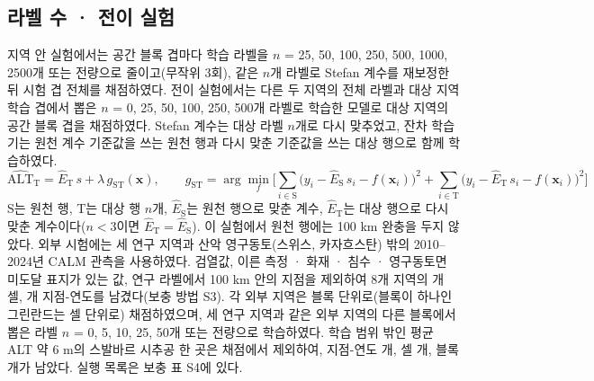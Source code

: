 \subsection{라벨 수 · 전이 실험}
지역 안 실험에서는 공간 블록 겹마다 학습 라벨을 $n$ = 25, 50, 100, 250, 500, 1000, 2500개 또는 전량으로 줄이고(무작위 3회), 같은 $n$개 라벨로 Stefan 계수를 재보정한 뒤 시험 겹 전체를 채점하였다. 전이 실험에서는 다른 두 지역의 전체 라벨과 대상 지역 학습 겹에서 뽑은 $n$ = 0, 25, 50, 100, 250, 500개 라벨로 학습한 모델로 대상 지역의 공간 블록 겹을 채점하였다. Stefan 계수는 대상 라벨 $n$개로 다시 맞추었고, 잔차 학습기는 원천 계수 기준값을 쓰는 원천 행과 다시 맞춘 기준값을 쓰는 대상 행으로 함께 학습하였다.
\begin{equation}
\widehat{\mathrm{ALT}}_{\mathrm{T}} = \hat{E}_{\mathrm{T}}\, s + \lambda\, g_{\mathrm{ST}}(\mathbf{x}), \qquad
g_{\mathrm{ST}} = \arg\min_{f} \Big[ \sum_{i \in \mathrm{S}} \big( y_i - \hat{E}_{\mathrm{S}}\, s_i - f(\mathbf{x}_i) \big)^{2} + \sum_{i \in \mathrm{T}} \big( y_i - \hat{E}_{\mathrm{T}}\, s_i - f(\mathbf{x}_i) \big)^{2} \Big]
\label{eq:transfer}
\end{equation}
S는 원천 행, T는 대상 행 $n$개, $\hat{E}_{\mathrm{S}}$는 원천 행으로 맞춘 계수, $\hat{E}_{\mathrm{T}}$는 대상 행으로 다시 맞춘 계수이다($n < 3$이면 $\hat{E}_{\mathrm{T}} = \hat{E}_{\mathrm{S}}$). 이 실험에서 원천 행에는 100 km 완충을 두지 않았다. 외부 시험에는 세 연구 지역과 산악 영구동토(스위스, 카자흐스탄) 밖의 2010--2024년 CALM 관측\cite{Streletskiy2025}을 사용하였다. 검열값, 이른 측정 · 화재 · 침수 · 영구동토면 미도달 표지가 있는 값, 연구 라벨에서 100 km 안의 지점을 제외하여 8개 지역의 \nextcells{}개 셀, \nextcy{}개 지점-연도를 남겼다(보충 방법 S3). 각 외부 지역은 블록 단위로(블록이 하나인 그린란드는 셀 단위로) 채점하였으며, 세 연구 지역과 같은 외부 지역의 다른 블록에서 뽑은 라벨 $n$ = 0, 5, 10, 25, 50개 또는 전량으로 학습하였다. 학습 범위 밖인 평균 ALT 약 6 m의 스발바르 시추공 한 곳은 채점에서 제외하여, 지점-연도 \nftScoredRows{}개, 셀 \nftScoredCells{}개, 블록 \nftScoredBlocks{}개가 남았다. 실행 목록은 보충 표 S4에 있다.

